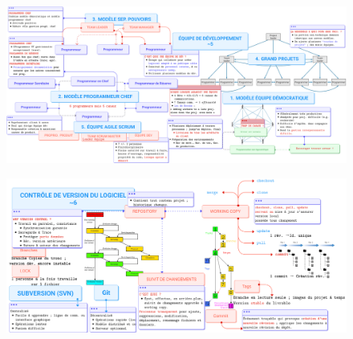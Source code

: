 \documentclass[16pt]{report}
\begin{document}
        \begin{figure}[H]
            \begin{center}
                \includegraphics[width=1.035\textwidth, height=0.70\textwidth]{IFT2255Chapitre5.png}
            \end{center}
        \end{figure}

        \begin{figure}[H]
            \begin{center}
                \includegraphics[width=1.05\textwidth]{IFT2255Chapritre6.png}
            \end{center}
        \end{figure}
\end{document}
